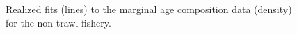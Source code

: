 \documentclass[
]{scrartcl}
\begin{document}
\begin{figure}[H]


\caption{\label{fig-marage_nt}Realized fits (lines) to the marginal age
composition data (density) for the non-trawl fishery.}

\end{figure}%
\end{document}
